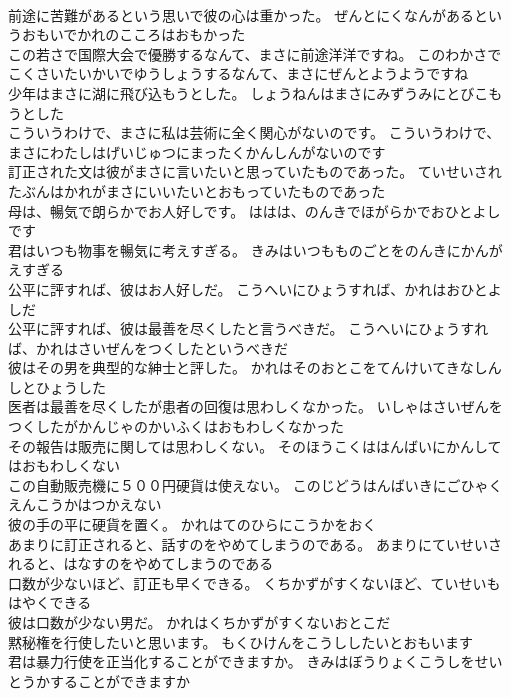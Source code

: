 \documentclass[8pt]{extreport}
\begin{document}
\begin{CJK}{UTF8}{min}
\\	前途に苦難があるという思いで彼の心は重かった。	ぜんとにくなんがあるというおもいでかれのこころはおもかった 
\\	この若さで国際大会で優勝するなんて、まさに前途洋洋ですね。	このわかさでこくさいたいかいでゆうしょうするなんて、まさにぜんとようようですね 
\\	少年はまさに湖に飛び込もうとした。	しょうねんはまさにみずうみにとびこもうとした 
\\	こういうわけで、まさに私は芸術に全く関心がないのです。	こういうわけで、まさにわたしはげいじゅつにまったくかんしんがないのです 
\\	訂正された文は彼がまさに言いたいと思っていたものであった。	ていせいされたぶんはかれがまさにいいたいとおもっていたものであった 
\\	母は、暢気で朗らかでお人好しです。	ははは、のんきでほがらかでおひとよしです 
\\	君はいつも物事を暢気に考えすぎる。	きみはいつもものごとをのんきにかんがえすぎる 
\\	公平に評すれば、彼はお人好しだ。	こうへいにひょうすれば、かれはおひとよしだ 
\\	公平に評すれば、彼は最善を尽くしたと言うべきだ。	こうへいにひょうすれば、かれはさいぜんをつくしたというべきだ 
\\	彼はその男を典型的な紳士と評した。	かれはそのおとこをてんけいてきなしんしとひょうした 
\\	医者は最善を尽くしたが患者の回復は思わしくなかった。	いしゃはさいぜんをつくしたがかんじゃのかいふくはおもわしくなかった 
\\	その報告は販売に関しては思わしくない。	そのほうこくははんばいにかんしてはおもわしくない 
\\	この自動販売機に５００円硬貨は使えない。	このじどうはんばいきにごひゃくえんこうかはつかえない 
\\	彼の手の平に硬貨を置く。	かれはてのひらにこうかをおく 
\\	あまりに訂正されると、話すのをやめてしまうのである。	あまりにていせいされると、はなすのをやめてしまうのである 
\\	口数が少ないほど、訂正も早くできる。	くちかずがすくないほど、ていせいもはやくできる 
\\	彼は口数が少ない男だ。	かれはくちかずがすくないおとこだ 
\\	黙秘権を行使したいと思います。	もくひけんをこうししたいとおもいます 
\\	君は暴力行使を正当化することができますか。	きみはぼうりょくこうしをせいとうかすることができますか 

\end{CJK}
\end{document}
